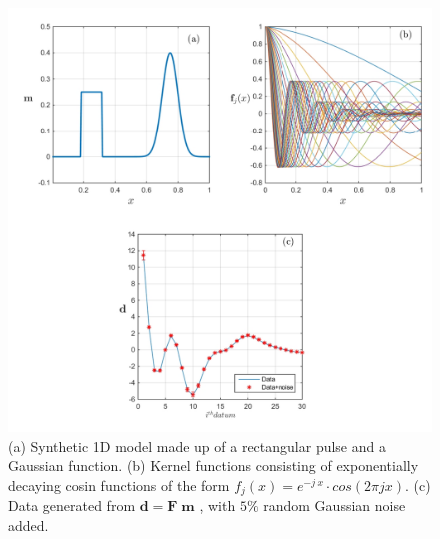 \begin{figure}[h!]
\centering
\includegraphics[scale=0.55]{1D_Kernel_data}
\caption{(a) Synthetic 1D model made up of a rectangular pulse and a Gaussian function. (b) Kernel functions consisting of exponentially decaying cosin functions of the form $ f_j(x) = e^{-j\:x }\cdot cos(2 \pi j x)$. (c) Data generated from $\mathbf{d =F \; m}$ , with $5\%$ random  Gaussian noise added. }
\label{fig:1D_model}
\end{figure}

